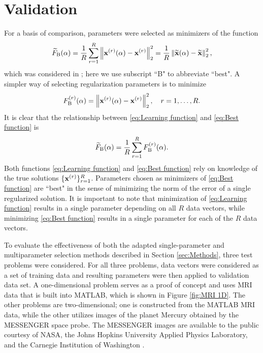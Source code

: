 \documentclass[12pt]{article}
\begin{document}
\section{Validation} \label{sec:Validation}
For a basis of comparison, parameters were selected as minimizers of the function
\begin{equation}
\label{eq:Learning function}
\widetilde{F}_{\text{B}}(\alpha) = \frac{1}{R}\sum_{r=1}^R \left\|\mathbf{x}^{(r)}(\alpha) - \mathbf{x}^{(r)}\right\|_2^2 = \frac{1}{R}\left\|\widetilde{\mathbf{x}}(\alpha) - \widetilde{\mathbf{x}}\right\|_2^2,
\end{equation} 
which was considered in \cite{ChungEspanol2017}; here we use subscript ``B" to abbreviate ``best". A simpler way of selecting regularization parameters is to minimize
\begin{equation}
\label{eq:Best function}
F_{\text{B}}^{(r)}(\alpha) = \left\|\mathbf{x}^{(r)}(\alpha) - \mathbf{x}^{(r)}\right\|_2^2, \quad r = 1,\ldots,R.
\end{equation}
It is clear that the relationship between \eqref{eq:Learning function} and \eqref{eq:Best function} is
\[\widetilde{F}_{\text{B}}(\alpha) = \frac{1}{R}\sum_{r=1}^R F_{\text{B}}^{(r)}(\alpha).\]
Both functions \eqref{eq:Learning function} and \eqref{eq:Best function} rely on knowledge of the true solutions $\{\mathbf{x}^{(r)}\}_{r=1}^R$. Parameters chosen as minimizers of \eqref{eq:Best function} are ``best" in the sense of minimizing the norm of the error of a single regularized solution. It is important to note that minimization of \eqref{eq:Learning function} results in a single parameter depending on all $R$ data vectors, while minimizing \eqref{eq:Best function} results in a single parameter for each of the $R$ data vectors. \par
To evaluate the effectiveness of both the adapted single-parameter and multiparameter selection methods described in Section \ref{sec:Methods}, three test problems were considered. For all three problems, data vectors were considered as a set of training data and resulting parameters were then applied to validation data set. A one-dimensional problem serves as a proof of concept and uses MRI data that is built into MATLAB, which is shown in Figure \ref{fig:MRI 1D}. The other problems are two-dimensional; one is constructed from the MATLAB MRI data, while the other utilizes images of the planet Mercury obtained by the MESSENGER space probe. The MESSENGER images are available to the public courtesy of NASA, the Johns Hopkins University Applied Physics Laboratory, and the Carnegie Institution of Washington \cite{MESSENGER}. \par
\end{document}

